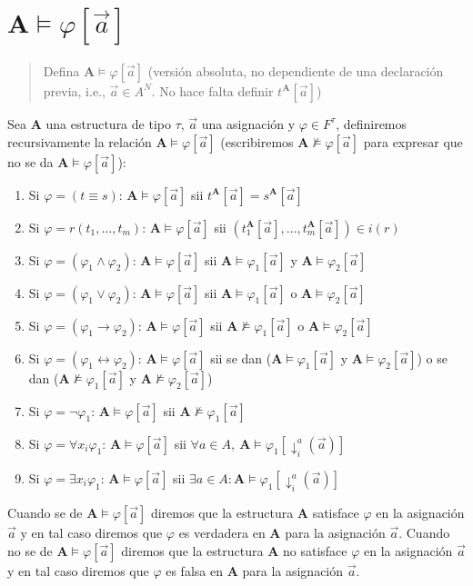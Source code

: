 \documentclass{article}
\begin{document}
\section{$\mathbf{A}\vDash\varphi[\vec{a}]$}
\begin{quote}
  Defina $\mathbf{A}\vDash\varphi[\vec{a}]$ (versión absoluta, no dependiente de una declaración previa, i.e., $\vec{a}\in A^N$. No hace falta definir $t^\mathbf{A}[\vec{a}]$)
\end{quote}
Sea $\mathbf{A}$ una estructura de tipo $\tau$, $\vec{a}$ una asignación y $\varphi\in F^\tau$, definiremos recursivamente la relación $\mathbf{A}\vDash\varphi[\vec{a}]$ (escribiremos $\mathbf{A}\nvDash\varphi[\vec{a}]$ para expresar que no se da $\mathbf{A}\vDash\varphi[\vec{a}]$):
\begin{enumerate}
  \item Si $\varphi=(t\equiv s)$: $\mathbf{A}\vDash\varphi[\vec{a}]$ sii $t^\mathbf{A}[\vec{a}]=s^\mathbf{A}[\vec{a}]$
  \item Si $\varphi=r(t_1,\dots,t_m)$: $\mathbf{A}\vDash\varphi[\vec{a}]$ sii $(t^\mathbf{A}_1[\vec{a}],\dots,t^\mathbf{A}_m[\vec{a}])\in i(r)$
  \item Si $\varphi=(\varphi_1\land\varphi_2)$: $\mathbf{A}\vDash\varphi[\vec{a}]$ sii $\mathbf{A}\vDash\varphi_1[\vec{a}]$ y $\mathbf{A}\vDash\varphi_2[\vec{a}]$
  \item Si $\varphi=(\varphi_1\lor\varphi_2)$: $\mathbf{A}\vDash\varphi[\vec{a}]$ sii $\mathbf{A}\vDash\varphi_1[\vec{a}]$ o $\mathbf{A}\vDash\varphi_2[\vec{a}]$
  \item Si $\varphi=(\varphi_1\to\varphi_2)$: $\mathbf{A}\vDash\varphi[\vec{a}]$ sii $\mathbf{A}\nvDash\varphi_1[\vec{a}]$ o $\mathbf{A}\vDash\varphi_2[\vec{a}]$
  \item Si $\varphi=(\varphi_1\leftrightarrow\varphi_2)$: $\mathbf{A}\vDash\varphi[\vec{a}]$ sii se dan ($\mathbf{A}\vDash\varphi_1[\vec{a}]$ y $\mathbf{A}\vDash\varphi_2[\vec{a}]$) o se dan ($\mathbf{A}\nvDash\varphi_1[\vec{a}]$ y $\mathbf{A}\nvDash\varphi_2[\vec{a}]$)
  \item Si $\varphi=\neg\varphi_1$: $\mathbf{A}\vDash\varphi[\vec{a}]$ sii $\mathbf{A}\nvDash\varphi_1[\vec{a}]$
  \item Si $\varphi=\forall x_i\varphi_1$: $\mathbf{A}\vDash\varphi[\vec{a}]$ sii $\forall a\in A,\ \mathbf{A}\vDash\varphi_1[\downarrow^a_i(\vec{a})]$
  \item Si $\varphi=\exists x_i\varphi_1$: $\mathbf{A}\vDash\varphi[\vec{a}]$ sii $\exists a\in A:\mathbf{A}\vDash\varphi_1[\downarrow^a_i(\vec{a})]$
\end{enumerate}
Cuando se de $\mathbf{A}\vDash\varphi[\vec{a}]$ diremos que la estructura $\mathbf{A}$ satisface $\varphi$ en la asignación $\vec{a}$ y en tal caso diremos que $\varphi$ es verdadera en $\mathbf{A}$ para la asignación $\vec{a}$.
\newline
Cuando no se de $\mathbf{A}\vDash\varphi[\vec{a}]$ diremos que la estructura $\mathbf{A}$ no satisface $\varphi$ en la asignación $\vec{a}$ y en tal caso diremos que $\varphi$ es falsa en $\mathbf{A}$ para la asignación $\vec{a}$.
\end{document}
